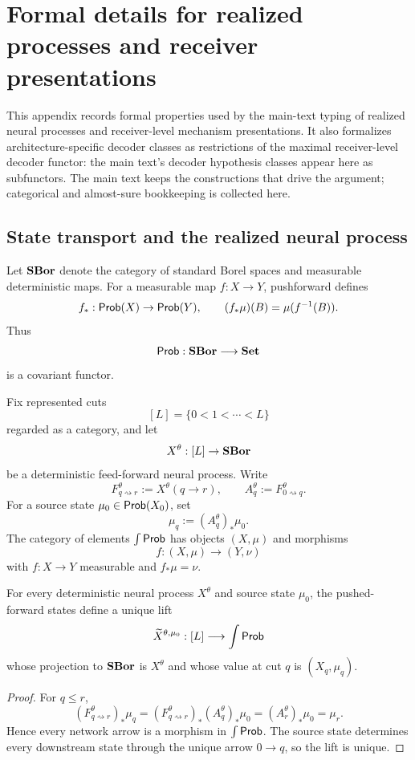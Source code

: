 \section{Formal details for realized processes and receiver presentations}
\label{app:process-presentation-details}

This appendix records formal properties used by the main-text typing of realized neural processes and receiver-level mechanism presentations. It also formalizes architecture-specific decoder classes as restrictions of the maximal receiver-level decoder functor: the main text's decoder hypothesis classes appear here as subfunctors. The main text keeps the constructions that drive the argument; categorical and almost-sure bookkeeping is collected here.

\subsection{State transport and the realized neural process}

Let $\mathbf{SBor}$ denote the category of standard Borel spaces and measurable deterministic maps. For a measurable map $f:X\to Y$, pushforward defines
\[
f_*:\mathsf{Prob}(X)\to\mathsf{Prob}(Y),
\qquad
(f_*\mu)(B)=\mu(f^{-1}(B)).
\]
Thus
\begin{equation}
\mathsf{Prob}:\mathbf{SBor}\longrightarrow\mathbf{Set}
\label{eq:app-probability-functor}
\end{equation}
is a covariant functor.

Fix represented cuts
\[
[L]=\{0<1<\cdots<L\}
\]
regarded as a category, and let
\[
X^\theta:[L]\to\mathbf{SBor}
\]
be a deterministic feed-forward neural process. Write
\[
F_{q\rightsquigarrow r}^\theta:=X^\theta(q\to r),
\qquad
A_q^\theta:=F_{0\rightsquigarrow q}^\theta.
\]
For a source state $\mu_0\in\mathsf{Prob}(X_0)$, set
\[
\mu_q:=(A_q^\theta)_*\mu_0.
\]
The category of elements $\int\mathsf{Prob}$ has objects $(X,\mu)$ and morphisms
\[
f:(X,\mu)\to(Y,\nu)
\]
with $f:X\to Y$ measurable and $f_*\mu=\nu$.

\begin{proposition}
\label{thm:app-state-decorated-process}
For every deterministic neural process $X^\theta$ and source state $\mu_0$, the pushed-forward states define a unique lift
\[
\widetilde X^{\theta,\mu_0}:[L]\longrightarrow\int\mathsf{Prob}
\]
whose projection to $\mathbf{SBor}$ is $X^\theta$ and whose value at cut $q$ is $(X_q,\mu_q)$.
\end{proposition}

\begin{proof}
For $q\le r$,
\[
(F_{q\rightsquigarrow r}^\theta)_*\mu_q
=(F_{q\rightsquigarrow r}^\theta)_*(A_q^\theta)_*\mu_0
=(A_r^\theta)_*\mu_0
=\mu_r.
\]
Hence every network arrow is a morphism in $\int\mathsf{Prob}$. The source state determines every downstream state through the unique arrow $0\to q$, so the lift is unique.
\end{proof}

